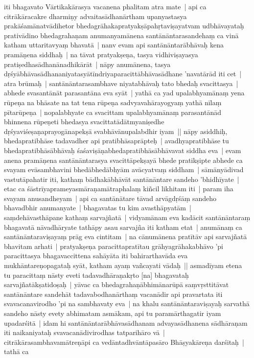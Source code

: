 \documentclass[article,12pt,a4paper]{memoir}
\begin{document}
	  \pstart iti bhagavato Vārtikakārasya vacanena phalitam atra mate | api ca citrākāracakre dharmiṇy advaitasādhanārtham upanyastasya prakāśamānatvādihetor bhedagrāhakapratyakṣāpahṛtaviṣayatvam udbhāvayataḥ prativādino bhedagrahaṇam anumanyamānena santānāntarasandehaṃ ca vinā katham uttaritavyaṃ bhavatā | \label{thakur75-148.21} nanv evam api santānāntarābhāvaḥ kena pramāṇena siddhaḥ | na tāvat pratyakṣeṇa, tasya vidhiviṣayasya pratiṣedhasādhanānadhikārāt | nāpy anumānena, tasya dṛśyābhāvasādhananiyatasyātīndriyaparacittābhāvasādhane 'navatārād iti cet | atra brūmaḥ | santānāntarasambhave niyatabhāvaḥ tato bhedaḥ svacittasya | abhede svasantānāt parasantāna eva syāt | yathā ca yad upalabhyamānaṃ yena rūpeṇa na bhāsate na tat tena rūpeṇa sadvyavahārayogyaṃ yathā nīlaṃ pītarūpeṇa | nopalabhyate ca svacittam upalabhyamānaṃ parasantānād bhinnena rūpeṇeti bhedasya svacittatādātmyaniṣedhe dṛśyaviśeṣaṇaprayogānapekṣā svabhāvānupalabdhir iyam || \label{thakur75-148.28} nāpy asiddhiḥ, bhedapratibhāse tadavadher api pratibhāsaprāpteḥ | avadhyapratibhāse tu bhedapratibhāsābhāvaḥ śaśaviṣāṇabhedapratibhāsābhāvavat siddha eva | evam anena pramāṇena santānāntarasya svacittāpekṣayā bhede pratikṣipte abhede ca svayam evāsambhavini bhedābhedābhyām avācyatvaṃ siddham | sāmānyādivad vastutāpahatir iti, kathaṃ bādhakābhāvāt santānāntare sandeho 'bhidhīyate | etac ca śāstrīyaprameyasmāraṇamātraphalaṃ kiñcil likhitam iti | param iha svayam anusandheyam | \label{thakur75-149.3} api ca santānātare tāvad arvāgdṛśāṃ sandeho bhavadbhir anumanyate | bhagavatas tu kim avasthāpyatām | saṃdehāvasthāpane kathaṃ sarvajñatā | vidyamānam eva kadācit santānāntaraṃ bhagavatā nāvadhāryate tathāpy asau sarvajña iti katham etat | anumānaṃ ca santānāntaraviṣayaṃ prāg eva cintitam | na cānumānena pratītāv api sarvajñatā bhavitam arhati | pratyakṣeṇa paracittapratītau grāhyagrāhakabhāvo 'pi paracittasya bhagavaccittena sahāyāta iti bahirarthavāda eva mukhāntareṇopagataḥ syāt, katham ayaṃ vañcayati vādaḥ || \label{thakur75-149.9} asmadīyam etena tu paracittaṃ nāsty eveti tadavadhāraṇakṛto [na] bhagavataḥ sarvajñatākṣatidoṣaḥ | yāvac ca bhedagrahaṇābhimānarūpā saṃvṛsttitāvat santānāntare sandehāt tadavabodhanārthaṃ vacanādir api pravartata iti svavacanavirodho 'pi na sambhavaty eva | na khalu santānāntaraviṣayaḥ sarvathā sandeho nāsty evety abhimatam asmākam, api tu paramārthagatir iyam upadarśitā | idam hi santānāntarābhāvasādhanam advayasādhanena sādhāraṇam iti naikaniyataḥ svavacanādivirodhas tatparihāro vā | citrākārasambhavamātreṇāpi ca vedāntadhvāntāpasāro Bhāṣyakāreṇa darśitaḥ | tathā ca
	\pend
      
\end{document}
